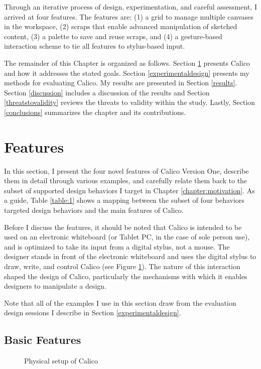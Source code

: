 Through an iterative process of design, experimentation, and careful assessment, I arrived at four features. The features are: (1) a grid to manage multiple canvases in the workspace, (2) scraps that enable advanced manipulation of sketched content, (3) a palette to save and reuse scraps, and (4) a gesture-based interaction scheme to tie all features to stylus-based input.

The remainder of this Chapter is organized as follows. Section \ref{calico} presents Calico and how it addresses the stated goals. Section \ref{experimentaldesign} presents my methods for evaluating Calico. My results are presented in Section \ref{results}. Section \ref{discussion} includes a discussion of the results and Section \ref{threatstovalidity} reviews the threats to validity within the study. Lastly, Section \ref{conclusions} summarizes the chapter and its contributions.

\section{Features}
\label{calico}
In this section, I present the four novel features of Calico Version One, describe them in detail through various examples, and carefully relate them back to the subset of supported design behaviors I target in Chapter \ref{chapter:motivation}. As a guide, Table \ref{table:1} shows a mapping between the subset of four behaviors targeted design behaviors and the main features of Calico.

Before I discuss the features, it should be noted that Calico is intended to be used on an electronic whiteboard (or Tablet PC, in the case of sole person use), and is optimized to take its input from a digital stylus, not a mouse. The designer stands in front of the electronic whiteboard and uses the digital stylus to draw, write, and control Calico (see Figure \ref{fig:2}). The nature of this interaction shaped the design of Calico, particularly the mechanisms with which it enables designers to manipulate a design.

Note that all of the examples I use in this section draw from the evaluation design sessions I describe in Section \ref{experimentaldesign}.

\subsection {Basic Features}
\label{calico:1}

\begin{figure}
  \centering
 
\caption {Physical setup of Calico}
\label{fig:2}       %
\end{figure}
%



